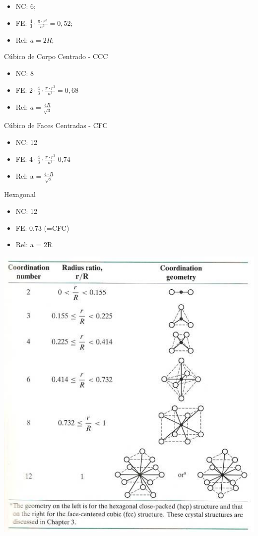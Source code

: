 \begin{itemize}
	\item NC: 6;
	\item FE: $\frac{4}{3} \cdot \frac{\pi \cdot r^{3}}{a^{3}} = 0,52$;
	\item Rel: $a = 2R$;	
\end{itemize}


Cúbico de Corpo Centrado - CCC

\begin{itemize}
	\item NC: 8
	\item FE: $2 \cdot \frac{4}{3} \cdot \frac{\pi \cdot r^{3}}{a^{3}} = 0,68$
	\item Rel: $a = \frac{4R}{\sqrt{3}}$
\end{itemize}


Cúbico de Faces Centradas - CFC

\begin{itemize}
	\setlength{\parskip}{0pt}
	\setlength{\itemsep}{0pt plus 1pt}
	
	\item NC: 12
	\item FE: $4 \cdot \frac{4}{3} \cdot \frac{\pi \cdot r^{3}}{a^{3}}$ 0,74
	\item Rel: a = $\frac{4 \cdot R}{\sqrt{2}}$
\end{itemize}

Hexagonal

\begin{itemize}
	
	\setlength{\parskip}{0pt}
	\setlength{\itemsep}{0pt plus 1pt}
	
	\item NC: 12
	\item FE: 0,73 (=CFC)
	\item Rel: a = 2R
\end{itemize}


 \includegraphics[scale=0.3,trim={0 0 0 0}]{figures/RELraio}
 
